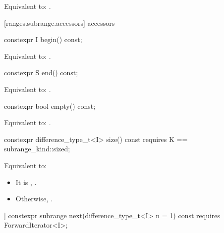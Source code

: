 \begin{addedblock}
\begin{itemdescr}
\pnum
\effects Equivalent to: .
\end{itemdescr}

[ranges.subrange.accessors]{ accessors}

%
\begin{itemdecl}
constexpr I begin() const;
\end{itemdecl}

\begin{itemdescr}
\pnum
\effects Equivalent to: .
\end{itemdescr}

%
\begin{itemdecl}
constexpr S end() const;
\end{itemdecl}

\begin{itemdescr}
\pnum
\effects Equivalent to: .
\end{itemdescr}

%
\begin{itemdecl}
constexpr bool empty() const;
\end{itemdecl}

\begin{itemdescr}
\pnum
\effects Equivalent to: .
\end{itemdescr}

%
\begin{itemdecl}
constexpr difference_type_t<I> size() const
  requires K == subrange_kind::sized;
\end{itemdecl}

\begin{itemdescr}
\pnum
\effects Equivalent to:
\begin{itemize}
\item It  is , .
\item Otherwise, .
\end{itemize}
\end{itemdescr}

%
\begin{itemdecl}
[[nodiscard]] constexpr subrange next(difference_type_t<I> n = 1) const
  requires ForwardIterator<I>;
\end{itemdecl}


\end{addedblock}
